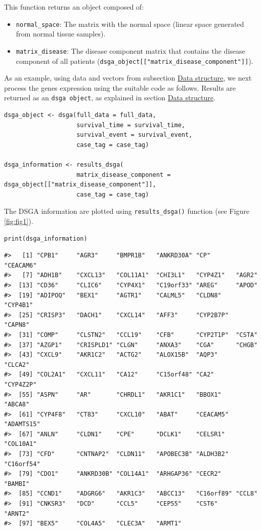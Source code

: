 This function returns an object composed of:

\begin{itemize}
\tightlist
\item
  \texttt{normal\_space}: The matrix with the normal space (linear space generated from normal tissue samples).
\item
  \texttt{matrix\_disease}: The disease component matrix that contains the disease component of all patients (\texttt{dsga\_object{[}{[}"matrix\_disease\_component"{]}{]}}).
\end{itemize}

As an example, using data and vectors from subsection \protect\hyperlink{section3}{Data structure}, we next process the genes expression using the suitable code as follows. Results are returned as an \texttt{dsga\ object}, as explained in section \protect\hyperlink{section3}{Data structure}.

\begin{verbatim}
dsga_object <- dsga(full_data = full_data,
                    survival_time = survival_time,
                    survival_event = survival_event,
                    case_tag = case_tag)

dsga_information <- results_dsga(
                    matrix_disease_component = dsga_object[["matrix_disease_component"]],
                    case_tag = case_tag)
\end{verbatim}

The DSGA information are plotted using \texttt{results\_dsga()} function (see Figure \ref{fig:fig1}).

\begin{verbatim}
print(dsga_information)
\end{verbatim}

\begin{verbatim}
#>   [1] "CPB1"     "AGR3"     "BMPR1B"   "ANKRD30A" "CP"       "CEACAM6" 
#>   [7] "ADH1B"    "CXCL13"   "COL11A1"  "CHI3L1"   "CYP4Z1"   "AGR2"    
#>  [13] "CD36"     "CLIC6"    "CYP4X1"   "C19orf33" "AREG"     "APOD"    
#>  [19] "ADIPOQ"   "BEX1"     "AGTR1"    "CALML5"   "CLDN8"    "CYP4B1"  
#>  [25] "CRISP3"   "DACH1"    "CXCL14"   "AFF3"     "CYP2B7P"  "CAPN8"   
#>  [31] "COMP"     "CLSTN2"   "CCL19"    "CFB"      "CYP2T1P"  "CSTA"    
#>  [37] "AZGP1"    "CRISPLD1" "CLGN"     "ANXA3"    "CGA"      "CHGB"    
#>  [43] "CXCL9"    "AKR1C2"   "ACTG2"    "ALOX15B"  "AQP3"     "CLCA2"   
#>  [49] "COL2A1"   "CXCL11"   "CA12"     "C15orf48" "CA2"      "CYP4Z2P" 
#>  [55] "ASPN"     "AR"       "CHRDL1"   "AKR1C1"   "BBOX1"    "ABCA8"   
#>  [61] "CYP4F8"   "CT83"     "CXCL10"   "ABAT"     "CEACAM5"  "ADAMTS15"
#>  [67] "ANLN"     "CLDN1"    "CPE"      "DCLK1"    "CELSR1"   "COL10A1" 
#>  [73] "CFD"      "CNTNAP2"  "CLDN11"   "APOBEC3B" "ALDH3B2"  "C16orf54"
#>  [79] "CDO1"     "ANKRD30B" "COL14A1"  "ARHGAP36" "CECR2"    "BAMBI"   
#>  [85] "CCND1"    "ADGRG6"   "AKR1C3"   "ABCC13"   "C16orf89" "CCL8"    
#>  [91] "CNKSR3"   "DCD"      "CCL5"     "CEP55"    "CST6"     "ARNT2"   
#>  [97] "BEX5"     "COL4A5"   "CLEC3A"   "ARMT1"
\end{verbatim}

